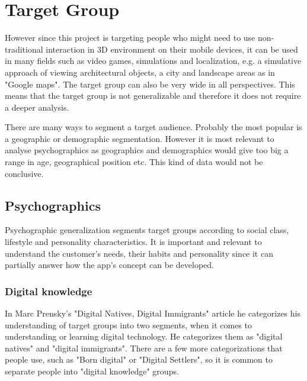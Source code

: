 \section{Target Group}


However since this project is targeting people who might need to use non-traditional interaction in 3D environment on their mobile devices, it can be used in many fields such as video games, simulations and localization, e.g. a simulative approach of viewing architectural objects, a city and landscape areas as in "Google maps". %
The target group can also be very wide in all perspectives. This means that the target group is not generalizable and therefore it does not require a deeper analysis. 

There are many ways to segment a target audience. Probably the most popular is a geographic or demographic segmentation. However it is most relevant to analyse psychographics as geographics and demographics would give too big a range in age, geographical position etc. This kind of data would not be conclusive. 

\subsection{Psychographics}
Psychographic generalization segments target groups according to social class, lifestyle and personality characteristics. \cite{Psychographic} It is important and relevant to understand the customer's needs, their habits and personality since it can partially answer how the app's concept can be developed.

\subsubsection{Digital knowledge}
In Marc Prensky's "Digital Natives, Digital Immigrants" \cite{DigitalImmigrants} article he categorizes his understanding of target groups into two segments, when it comes to understanding or learning digital technology. He categorizes them as "digital natives" and "digital immigrants". There are a few more categorizations that people use, such as "Born digital" or "Digital Settlers", so it is common to separate people into "digital knowledge" groups. 

